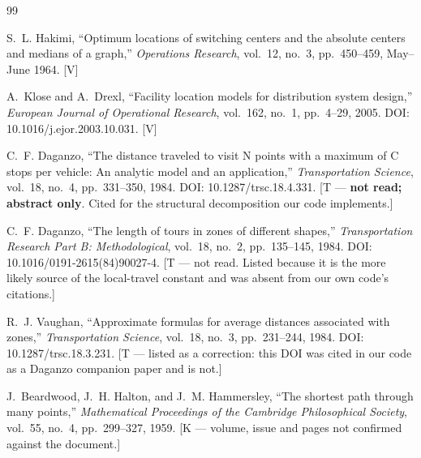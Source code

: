 \documentclass[conference]{IEEEtran}
\begin{document}
\begin{thebibliography}{99}

S.~L. Hakimi, ``Optimum locations of switching centers and the absolute centers
and medians of a graph,'' \emph{Operations Research}, vol.~12, no.~3,
pp.~450--459, May--June 1964. [V]

A.~Klose and A.~Drexl, ``Facility location models for distribution system
design,'' \emph{European Journal of Operational Research}, vol.~162, no.~1,
pp.~4--29, 2005. DOI: 10.1016/j.ejor.2003.10.031. [V]

C.~F. Daganzo, ``The distance traveled to visit N points with a maximum of C
stops per vehicle: An analytic model and an application,''
\emph{Transportation Science}, vol.~18, no.~4, pp.~331--350, 1984.
DOI: 10.1287/trsc.18.4.331. [T --- \textbf{not read; abstract only}. Cited for
the structural decomposition our code implements.]

C.~F. Daganzo, ``The length of tours in zones of different shapes,''
\emph{Transportation Research Part B: Methodological}, vol.~18, no.~2,
pp.~135--145, 1984. DOI: 10.1016/0191-2615(84)90027-4. [T --- not read. Listed
because it is the more likely source of the local-travel constant and was
absent from our own code's citations.]

R.~J. Vaughan, ``Approximate formulas for average distances associated with
zones,'' \emph{Transportation Science}, vol.~18, no.~3, pp.~231--244, 1984.
DOI: 10.1287/trsc.18.3.231. [T --- listed as a correction: this DOI was cited
in our code as a Daganzo companion paper and is not.]

J.~Beardwood, J.~H. Halton, and J.~M. Hammersley, ``The shortest path through
many points,'' \emph{Mathematical Proceedings of the Cambridge Philosophical
Society}, vol.~55, no.~4, pp.~299--327, 1959. [K --- volume, issue and pages
not confirmed against the document.]


\end{thebibliography}
\end{document}
